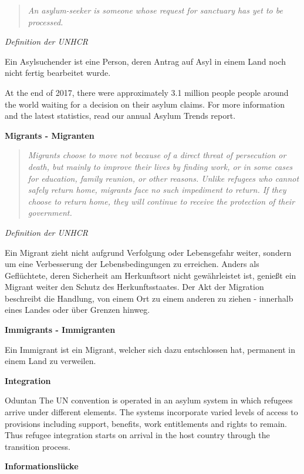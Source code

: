 \begin{quote}
    \textit{An asylum-seeker is someone whose request for sanctuary has yet to be processed.}\cite{unhcr2015asylum}
\end{quote}
\centerline{\textit{Definition der UNHCR}}


Ein Asylsuchender ist eine Person, deren Antrag auf Asyl in einem Land noch nicht fertig bearbeitet wurde.

At the end of 2017, there were approximately 3.1 million people people around the world waiting for a decision on their asylum claims. For more information and the latest statistics, read our annual Asylum Trends report.

\textbf{Migrants - Migranten}

\begin{quote}
    \textit{Migrants choose to move not because of a direct threat of persecution or death, but mainly to improve their lives by finding work, or in some cases for education, family reunion, or other reasons. Unlike refugees who cannot safely return home, migrants face no such impediment to return. If they choose to return home, they will continue to receive the protection of their government.}\cite{unhcr2016migrant}
\end{quote}
\centerline{\textit{Definition der UNHCR}}

Ein Migrant zieht nicht aufgrund Verfolgung oder Lebensgefahr weiter, sondern um eine Verbesserung der Lebensbedingungen zu erreichen. Anders als Geflüchtete, deren Sicherheit am Herkunftsort nicht gewährleistet ist, genießt ein Migrant weiter den Schutz des Herkunftsstaates.
Der Akt der Migration beschreibt die Handlung, von einem Ort zu einem anderen zu ziehen - innerhalb eines Landes oder über Grenzen hinweg.

\textbf{Immigrants - Immigranten}

Ein Immigrant ist ein Migrant, welcher sich dazu entschlossen hat, permanent in einem Land zu verweilen.

\textbf{Integration}


Oduntan
The UN convention is operated in an asylum system in
which refugees arrive under different elements. The
systems incorporate varied levels of access to provisions
including support, benefits, work entitlements and rights to
remain. Thus refugee integration starts on arrival in the host
country through the transition process.


\textbf{Informationslücke}

